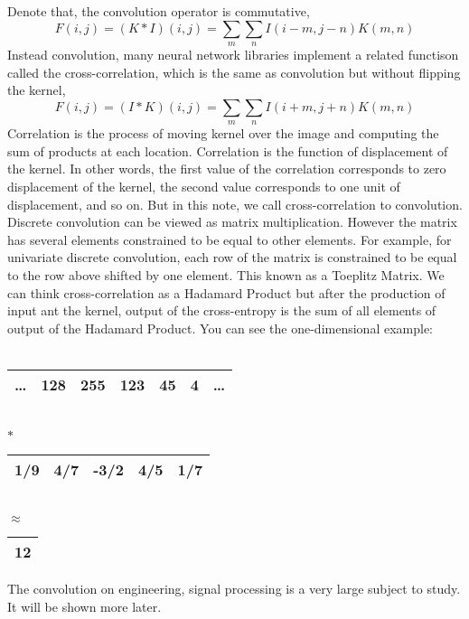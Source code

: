 \documentclass[11pt]{article}
\begin{document}
Denote that, the convolution operator is commutative,
$$F(i,j) = (K \ast I)(i,j)=\sum_{m}\sum_{n} I(i-m,j-n)K(m,n)$$
Instead convolution, many neural network libraries implement a related functison called the cross-correlation, which is the same as convolution but without flipping the kernel,
$$F(i,j) = (I \ast K)(i,j)=\sum_{m}\sum_{n} I(i+m,j+n)K(m,n)$$
Correlation is the process of moving kernel over the image and computing the sum of products at each location. Correlation is the function of displacement of the kernel. In other words, the first value of the correlation corresponds to zero displacement of the kernel, the second value corresponds to one unit of displacement, and so on. But in this note, we call cross-correlation to convolution\cite{GoodBengCour16}. Discrete convolution can be viewed as matrix multiplication. However the matrix has several elements constrained to be equal to other elements. For example, for univariate discrete convolution, each row of the matrix is constrained to be equal to the row above shifted by one element. This known as a Toeplitz Matrix. We can think cross-correlation as a Hadamard Product but after the production of input ant the kernel, output of the cross-entropy is the sum of all elements of output of the Hadamard Product.
You can see the one-dimensional example:\\
\\
\begin{center}
\begin{tabular}{|c|c|c|c|c|c|c|}
\hline
\dots & 128 & 255 & 123 & 45 & 4 & \dots \\ \hline
\end{tabular}
\\
$\ast$ \\
\begin{tabular}{|c|c|c|c|c|}
\hline
 1/9 & 4/7 & -3/2 & 4/5 & 1/7 \\ \hline
\end{tabular}
\\
$\approx$
\\
\begin{tabular}{|c|}
\hline
 12 \\ \hline
\end{tabular}
\end{center}
The convolution on engineering, signal processing is a very large subject to study. It will be shown more later.
\end{document}
